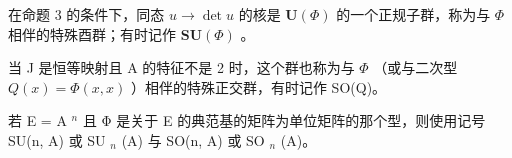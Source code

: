 在命题 3 的条件下，同态 \(u \to \det u\) 的核是 \(\mathbf{U}(\Phi)\) 的一个正规子群，称为与 \(\Phi\) 相伴的特殊酉群；有时记作 \(\mathbf{SU}(\Phi)\) 。

当 J 是恒等映射且 A 的特征不是 2 时，这个群也称为与 \(\Phi\) （或与二次型 \(Q(x) = \Phi(x, x)\) ）相伴的特殊正交群，有时记作 SO(Q)。

若 E = A \(^{n}\) 且 Φ 是关于 E 的典范基的矩阵为单位矩阵的那个型，则使用记号 SU(n, A) 或 SU \(_{n}\) (A) 与 SO(n, A) 或 SO \(_{n}\) (A)。

